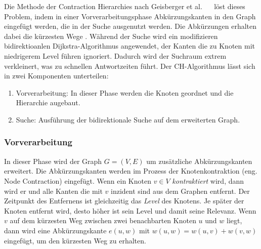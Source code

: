 Die Methode der Contraction Hierarchies nach Geisberger et al.
\cite{geisberger.workshop}~\cite{geisberger.thesis}~\cite{geisberger.exact} löst dieses Problem,
indem in einer Vorverarbeitungsphase Abkürzungskanten in den Graph eingefügt werden, die in der
Suche ausgenutzt werden. Die Abkürzungen erhalten dabei die kürzesten Wege \cite{Bast.20.04.2015}.
Während der Suche wird ein modifizieren bidirektioanlen Dijkstra-Algorithmus angewendet, der Kanten
die zu Knoten mit niedrigerem Level führen ignoriert. Dadurch wird der Suchraum extrem verkleinert,
was zu schnellen Antwortzeiten führt. Der CH-Algorithmus lässt sich in zwei Komponenten unterteilen:
\begin{enumerate}
    \item Vorverarbeitung: In dieser Phase werden die Knoten geordnet und die Hierarchie augebaut.
    \item Suche: Ausführung der bidirektionale Suche auf dem erweiterten Graph.
\end{enumerate}


\subsubsection{Vorverarbeitung}
In dieser Phase wird der Graph $G = (V,E)$ um zusätzliche Abkürzungskanten erweitert. Die
Abkürzungskanten werden im Prozess der Knotenkontraktion (eng. Node Contraction) eingefügt. Wenn ein
Knoten $v \in V$ \emph{kontraktiert} wird, dann wird er und alle Kanten die mit $v$ inzident sind
aus dem Graphen entfernt. Der Zeitpunkt des Entfernens ist gleichzeitig das \emph{Level} des
Knotens. Je später der Knoten entfernt wird, desto höher ist sein Level und damit seine Relevanz.
Wenn $v$ auf dem kürzesten Weg zwischen zwei benachbarten Knoten $u$ und $w$ liegt, dann wird eine
Abkürzungskante $e(u,w)$ mit $w(u,w) = w(u,v) + w(v,w)$ eingefügt, um den kürzesten Weg zu erhalten.

